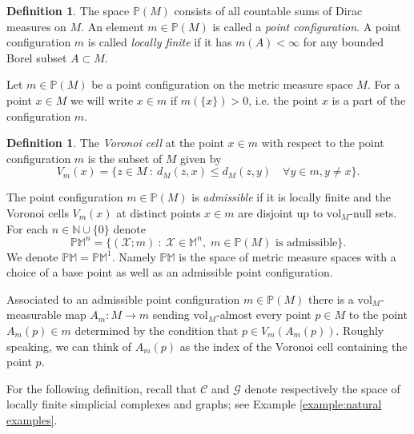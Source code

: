 \documentclass{amsart}
\newcommand{\NN}{\mathbb{N}}
\newcommand{\MM}{\mathbb{M}}
\newcommand{\MP}{\mathbb{PM}}
\newcommand{\Points}{\mathbb{P}}
\newcommand{\Graphs}{\mathcal{G}}
\newcommand{\Complexes}{\mathcal{C}}
\newcommand{\vol}{\mathrm{vol}}
\theoremstyle{plain}
\numberwithin{equation}{section}
\theoremstyle{definition}
\newtheorem{definition}[theorem]{Definition}
\begin{document}
\begin{definition}
The space $\Points(M)$ consists of all countable sums of Dirac measures on $M$. An element $m \in \Points(M)$ is called a \emph{point configuration}. A point configuration $m$ is called \emph{locally finite} if it has $m(A) < \infty$ for any bounded Borel subset $A \subset M$.
\end{definition}

Let $m \in \Points(M)$ be a point configuration on the metric measure space $M$. For a point $x \in M$  we will write $x \in m$ if $m(\{x\}) > 0$, i.e. the point $x$ is a part of the configuration $m$.

\begin{definition}
The \emph{Voronoi cell} at the point $x \in m$ with respect to the point configuration $m$ is the subset of $M$ given by
\begin{equation}
V_m(x) = \{z \in M \: : \: d_M(z,x) \le d_M(z,y) \quad \forall y \in m, y \neq x\}.
\end{equation}
\end{definition}

The point configuration $m \in \Points(M)$ is \emph{admissible} if it is locally finite and the Voronoi cells $V_m(x)$ at distinct points $x \in m$ are disjoint up to $\vol_M$-null sets.
For each $n \in \NN \cup \{0\}$ denote
$$ \MP^n = \{ (\mathcal X;m) \: : \: \mathcal X  \in \MM^n, \; m \in \Points(M) \text{ is admissible}\}.$$
We denote $\MP = \MP^1$. Namely $\MP$ is the space of metric measure spaces with a choice of a base point as well as an admissible point configuration.

Associated to an admissible point configuration $m \in \Points(M)$ there is a $\mathrm{vol}_M$-measurable map $A_m : M \to m$ sending $\mathrm{vol}_M$-almost every point $p \in M $ 
to the point $A_m(p) \in m$ determined by the condition that $p \in V_m(A_m(p))$. Roughly speaking, we can think of $A_m(p)$ as the index of the Voronoi cell containing the point $p$.

For the following definition, recall that  $\Complexes$ and $\Graphs$ denote respectively the space of locally finite simplicial complexes and graphs; see Example \ref{example:natural examples}.
\end{document}
